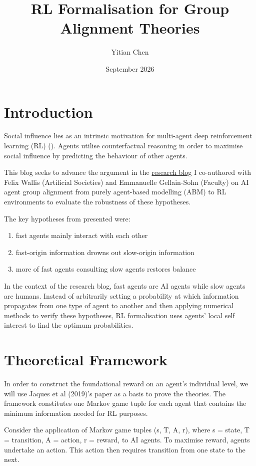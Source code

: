 \documentclass{article}
\title{RL Formalisation for Group Alignment Theories}
\author{Yitian Chen}
\date{September 2026}
\begin{document}
\maketitle

\section{Introduction}

Social influence lies as an intrinsic motivation for multi-agent deep reinforcement learning (RL) (\cite{jaques2019social}). Agents utilise counterfactual reasoning in order to maximise social influence by predicting the behaviour of other agents.

This blog seeks to advance the argument in the \href{https://societies.ai/group-alignment}{research blog} I co-authored with Felix Wallis (Artificial Societies) and Emmanuelle Gellain-Sohn (Faculty) on AI agent group alignment from purely agent-based modelling (ABM) to RL environments to evaluate the robustness of these hypotheses. 

The key hypotheses from presented were:

\begin{enumerate}
    \item fast agents mainly interact with each other
    \item fast-origin information drowns out slow-origin information
    \item more of fast agents consulting slow agents restores balance
\end{enumerate}

In the context of the research blog, fast agents are AI agents while slow agents are humans. Instead of arbitrarily setting a probability at which information propagates from one type of agent to another and then applying numerical methods to verify these hypotheses, RL formalisation uses agents' local self interest to find the optimum probabilities. 


\section{Theoretical Framework}

In order to construct the foundational reward on an agent's individual level, we will use Jaques et al (2019)'s paper as a basis to prove the theories. The framework constitutes one Markov game tuple for each agent that contains the minimum information needed for RL purposes.

Consider the application of Markov game tuples (s, T, A, r), where s = state, T = transition, A = action, r = reward, to AI agents. To maximise reward, agents undertake an action. This action then requires transition from one state to the next. 
\end{document}
